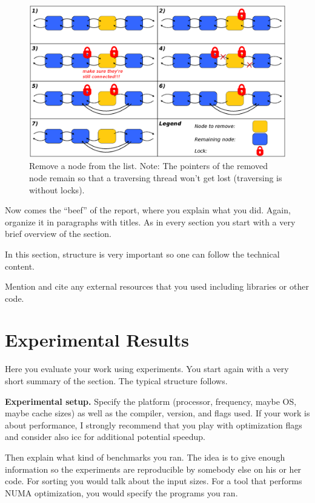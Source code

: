 \documentclass[letterpaper]{article}
\newcommand{\mypar}[1]{{\bf #1.}}
\begin{document}
\begin{figure}[h]\centering
  \includegraphics[scale=0.31]{remove.eps}
  \caption{Remove a node from the list. Note: The pointers of the removed node remain so that a traversing thread won't get lost (traversing is without locks). \label{fig:remove}}
\end{figure}

Now comes the ``beef'' of the report, where you explain what you
did. Again, organize it in paragraphs with titles. As in every section
you start with a very brief overview of the section.

In this section, structure is very important so one can follow the technical content.

Mention and cite any external resources that you used including libraries or other code.

\section{Experimental Results}\label{sec:exp}

Here you evaluate your work using experiments. You start again with a
very short summary of the section. The typical structure follows.

\mypar{Experimental setup} Specify the platform (processor, frequency, maybe OS, maybe cache sizes)
as well as the compiler, version, and flags used. If your work is about performance, 
I strongly recommend that you play with optimization flags and consider also icc for additional potential speedup.

Then explain what kind of benchmarks you ran. The idea is to give enough information so the experiments are reproducible by somebody else on his or her code.
For sorting you would talk about the input sizes. For a tool that performs NUMA optimization, you would specify the programs you ran.
\end{document}
